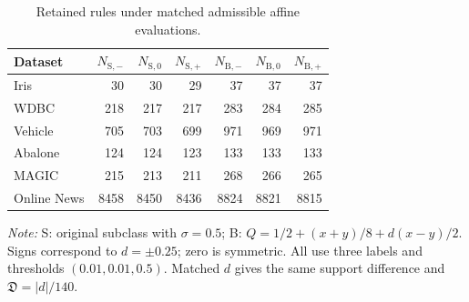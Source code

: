 \begin{table}[t]
\centering\color{red}
\caption{Retained rules under matched admissible affine evaluations.}
\label{tab:affine-matched}
\begin{tabular}{lrrrrrr}
\toprule
Dataset & $N_{\mathrm S,-}$ & $N_{\mathrm S,0}$ & $N_{\mathrm S,+}$ & $N_{\mathrm B,-}$ & $N_{\mathrm B,0}$ & $N_{\mathrm B,+}$ \\
\midrule
Iris & 30 & 30 & 29 & 37 & 37 & 37 \\
WDBC & 218 & 217 & 217 & 283 & 284 & 285 \\
Vehicle & 705 & 703 & 699 & 971 & 969 & 971 \\
Abalone & 124 & 124 & 123 & 133 & 133 & 133 \\
MAGIC & 215 & 213 & 211 & 268 & 266 & 265 \\
Online News & 8458 & 8450 & 8436 & 8824 & 8821 & 8815 \\
\bottomrule
\end{tabular}
\par\vspace{0.4ex}\footnotesize\emph{Note:} S: original subclass with $\sigma=0.5$; B: $Q=1/2+(x+y)/8+d(x-y)/2$. Signs correspond to $d=\pm0.25$; zero is symmetric. All use three labels and thresholds $(0.01,0.01,0.5)$. Matched $d$ gives the same support difference and $\mathfrak D=|d|/140$.
\end{table}
